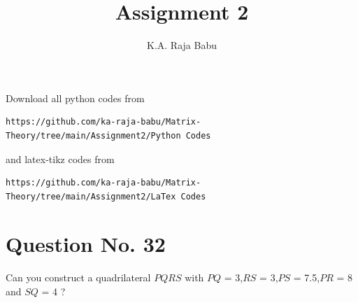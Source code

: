 \documentclass[journal,12pt,twocolumn]{IEEEtran}
\begin{document}
     \def\rightbox#1{\makebox[0in][r]{#1}}
     \def\centbox#1{\makebox[0in]{#1}}
     \def\topbox#1{\raisebox{-\baselineskip}[0in][0in]{#1}}
     \def\midbox#1{\raisebox{-0.5\baselineskip}[0in][0in]{#1}}
\vspace{3cm}
\title{Assignment 2}
\author{K.A. Raja Babu}
\maketitle
\newpage
\bigskip
\renewcommand{\thefigure}{\theenumi}
\renewcommand{\thetable}{\theenumi}
Download all python codes from 
\begin{lstlisting}
https://github.com/ka-raja-babu/Matrix-Theory/tree/main/Assignment2/Python Codes
\end{lstlisting}
%
and latex-tikz codes from 
%
\begin{lstlisting}
https://github.com/ka-raja-babu/Matrix-Theory/tree/main/Assignment2/LaTex Codes
\end{lstlisting}
%
\section{Question No. 32}
Can you construct a quadrilateral $PQRS$ with $PQ$ = 3,$RS$ = 3,$PS$ = 7.5,$PR$ = 8 and $SQ$ = 4 ?
%
\end{document}
